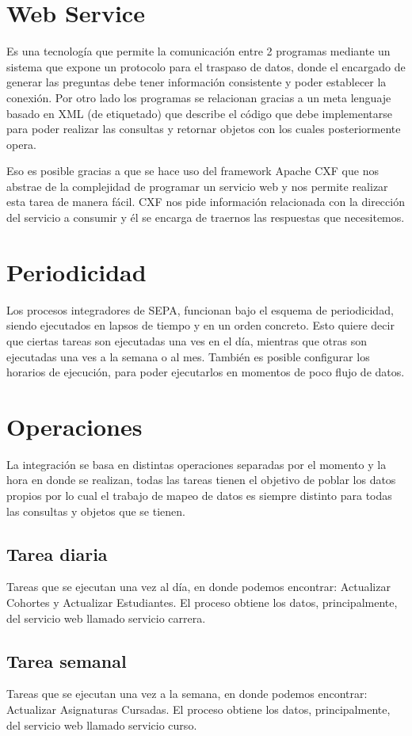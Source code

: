 \documentclass[a4paper,12pt,openany,oneside]{book}
\begin{document}
\section{Web Service}
Es una tecnología que permite la comunicación entre 2 programas mediante un sistema que expone un protocolo para el traspaso de datos, donde el encargado de generar las preguntas debe tener información consistente y poder establecer la conexión. Por otro lado los programas se relacionan gracias a un meta lenguaje basado en XML (de etiquetado) que describe el código que debe implementarse para poder realizar las consultas y retornar objetos con los cuales posteriormente opera.

Eso es posible gracias a que se hace uso del framework Apache CXF que nos abstrae de la complejidad de programar un servicio web y nos permite realizar esta tarea de manera fácil. CXF nos pide información relacionada con la dirección del servicio a consumir y él se encarga de traernos las respuestas que necesitemos.

\section{Periodicidad}
Los procesos integradores de SEPA, funcionan bajo el esquema de periodicidad, siendo ejecutados en lapsos de tiempo y en un orden concreto. Esto quiere decir que ciertas tareas son ejecutadas una ves en el día, mientras que otras son ejecutadas una ves a la semana o al mes. También es posible configurar los horarios de ejecución, para poder ejecutarlos en momentos de poco flujo de datos.

\section{Operaciones}
La integración se basa en distintas operaciones separadas por el momento y la hora en donde se realizan, todas las tareas tienen el objetivo de poblar los datos propios por lo cual el trabajo de mapeo de datos es siempre distinto para todas las consultas y objetos que se tienen.
\subsection{Tarea diaria}
Tareas que se ejecutan una vez al día, en donde podemos encontrar: Actualizar Cohortes y Actualizar Estudiantes. El proceso obtiene los datos, principalmente, del servicio web llamado servicio carrera.
\subsection{Tarea semanal}
Tareas que se ejecutan una vez a la semana, en donde podemos encontrar: Actualizar Asignaturas Cursadas. El proceso obtiene los datos, principalmente, del servicio web llamado servicio curso.
\end{document}
